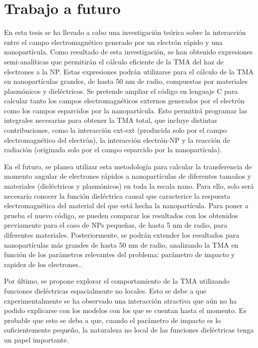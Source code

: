 \section{Trabajo a futuro}

En esta tesis se ha llevado a cabo una investigación teórica sobre la interacción entre el campo electromagnético generado por un electrón rápido y una nanopartícula. Como resultado de esta investigación, se han obtenido expresiones semi-analíticas que permitirán el cálculo eficiente de la TMA del  haz de electrones a la NP. Estas expresiones podrán utilizarse para el cálculo de la TMA en nanopartículas grandes, de hasta 50 nm de radio, compuestas por materiales plasmónicos y dieléctricos. Se pretende ampliar el código en lenguaje C para calcular tanto los campos electromagnéticos externos generados por el electrón como los campos esparcidos por la nanopartícula. Esto permitirá programar las integrales necesarias para obtener la TMA total, que incluye distintas contribuciones, como la interacción ext-ext (producida solo por el campo electromagnético del electrón), la interacción electrón-NP y la reacción de radiación (originada solo por el campo esparcido por la nanopartícula).

En el futuro, se planea utilizar esta metodología para calcular la transferencia de momento angular de electrones rápidos a nanopartículas de diferentes tamaños y materiales (dieléctricos y plasmónicos) en toda la escala nano. Para ello, solo será necesario conocer la función dieléctrica causal que caracterice la respuesta electromagnética del material del que está hecha la nanopartícula. Para poner a prueba el nuevo código, se pueden comparar los resultados con los obtenidos previamente para el caso de NPs pequeñas, de hasta 5 nm de radio, para diferentes materiales. Posteriormente, se podrán extender los resultados para nanopartículas más grandes de hasta 50 nm de radio, analizando la TMA en función de los parámetros relevantes del problema: parámetro de impacto y rapidez de los electrones..

Por último, se propone explorar el comportamiento de la TMA utilizando funciones dieléctricas espacialmente no locales. Esto se debe a que experimentalmente se ha observado una interacción atractiva que aún no ha podido explicarse con los modelos con los que se cuentan hasta el momento. Es probable que esto se deba a que, cuando el parámetro de impacto es lo suficientemente pequeño, la naturaleza no local de las funciones dieléctricas tenga un papel importante.